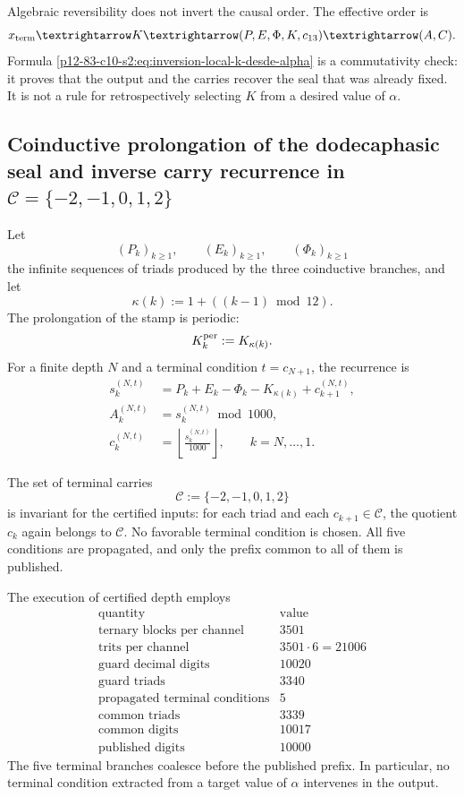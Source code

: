 Algebraic reversibility does not invert the causal order. The effective order
is
\[
 x_{\rm term}
 \longrightarrow K
 \longrightarrow(P,E,\Phi,K,c_{13})
 \longrightarrow(A,C).
\]
Formula \eqref{p12-83-c10-s2:eq:inversion-local-k-desde-alpha} is a commutativity
check: it proves that the output and the carries recover the seal
that was already fixed. It is not a rule for retrospectively selecting
\(K\) from a desired value of \(\alpha\).

\subsection{Coinductive prolongation of the dodecaphasic seal and inverse carry recurrence in \(\mathcal C=\{-2,-1,0,1,2\}\)}

Let
\[
 (P_k)_{k\geq1},
 \qquad
 (E_k)_{k\geq1},
 \qquad
 (\Phi_k)_{k\geq1}
\]
the infinite sequences of triads produced by the three coinductive branches, and let
\[
 \kappa(k):=1+((k-1)\bmod12).
\]
The prolongation of the stamp is periodic:
\[
 K_k^{\rm per}:=K_{\kappa(k)}.
\]
For a finite depth \(N\) and a terminal condition
\(t=c_{N+1}\), the recurrence is
\begin{equation}
\begin{aligned}
 s_k^{(N,t)}
 &=P_k+E_k-\Phi_k-K_{\kappa(k)}+c_{k+1}^{(N,t)},\\
 A_k^{(N,t)}
 &=s_k^{(N,t)}\bmod1000,\\
 c_k^{(N,t)}
 &=\left\lfloor\frac{s_k^{(N,t)}}{1000}\right\rfloor,
 \qquad k=N,\ldots,1.
\end{aligned}
\label{p12-83-c10-s2:eq:recurrencia-larga-alpha}
\end{equation}

The set of terminal carries
\[
 \mathcal C:=\{-2,-1,0,1,2\}
\]
is invariant for the certified inputs: for each triad and each
\(c_{k+1}\in\mathcal C\), the quotient \(c_k\) again belongs to
\(\mathcal C\). No favorable terminal condition is chosen. All
five conditions are propagated, and only the prefix common to all of them is published.

The execution of certified depth employs
\[
\begin{array}{c|r}
\text{quantity}&\text{value}\\ \hline
\text{ternary blocks per channel}&3501\\
\text{trits per channel}&3501\cdot6=21006\\
\text{guard decimal digits}&10020\\
\text{guard triads}&3340\\
\text{propagated terminal conditions}&5\\
\text{common triads}&3339\\
\text{common digits}&10017\\
\text{published digits}&10000
\end{array}
\]
The five terminal branches coalesce before the published prefix. In
particular, no terminal condition extracted from a target value of
\(\alpha\) intervenes in the output.

